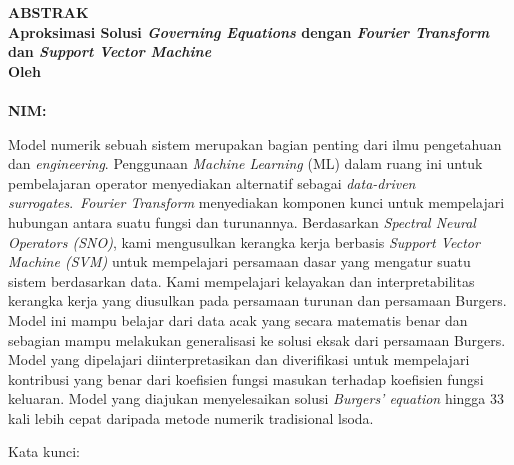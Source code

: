 \clearpage
{}
\begin{center}
\textbf{\large  ABSTRAK}\\[0.5cm]
\textbf{\large Aproksimasi Solusi \textit{Governing Equations} dengan \emph{Fourier Transform} dan \textit{Support Vector Machine}}\\[0.5cm]
\textbf{Oleh}\\
\textbf{\penulis}\\
\textbf{NIM:\@\nim}\\[2em]
\end{center}

\noindent Model numerik sebuah sistem merupakan bagian penting dari ilmu pengetahuan dan \textit{engineering}. Penggunaan \textit{Machine Learning} (ML) dalam ruang ini untuk pembelajaran operator menyediakan alternatif sebagai \textit{data-driven surrogates}.\ \textit{Fourier Transform} menyediakan komponen kunci untuk mempelajari hubungan antara suatu fungsi dan turunannya. Berdasarkan \textit{Spectral Neural Operators (SNO)}, kami mengusulkan kerangka kerja berbasis \textit{Support Vector Machine (SVM)} untuk mempelajari persamaan dasar yang mengatur suatu sistem berdasarkan data. Kami mempelajari kelayakan dan interpretabilitas kerangka kerja yang diusulkan pada persamaan turunan dan persamaan Burgers. Model ini mampu belajar dari data acak yang secara matematis benar dan sebagian mampu melakukan generalisasi ke solusi eksak dari persamaan Burgers. Model yang dipelajari diinterpretasikan dan diverifikasi untuk mempelajari kontribusi yang benar dari koefisien fungsi masukan terhadap koefisien fungsi keluaran. Model yang diajukan menyelesaikan solusi \textit{Burgers' equation} hingga 33 kali lebih cepat daripada metode numerik tradisional lsoda.




\noindent Kata kunci: \katakunci{}
